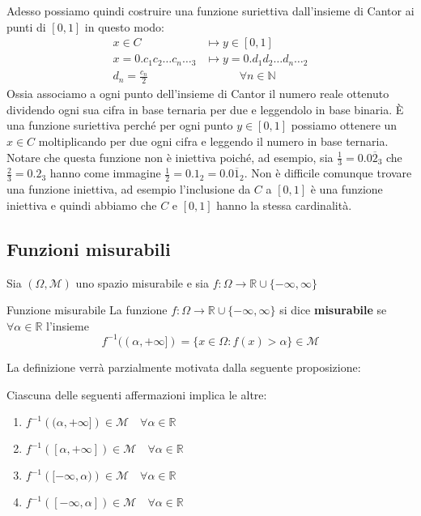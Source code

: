 \begin{example}
    Adesso possiamo quindi costruire una funzione suriettiva
    dall'insieme di Cantor ai punti di \([0, 1]\) in questo modo:
    \begin{align*}
        x \in C &\longmapsto y \in [0, 1] \\
        x = 0.c_{1}c_{2}\dots c_{n}\dots_3 &\longmapsto y =
        0.d_{1}d_{2}\dots d_{n}\dots_2 \\
        d_{n} = \frac{c_{n}}{2} \,&\quad\quad\quad \forall n \in \mathbb{N}
    \end{align*}
    Ossia associamo a ogni punto dell'insieme di Cantor il numero reale ottenuto
    dividendo ogni sua cifra in base ternaria per due e leggendolo in base
    binaria. È una funzione suriettiva perché per ogni punto \(y \in [0, 1]\) possiamo
    ottenere un \(x \in C\) moltiplicando per due ogni cifra e leggendo il
    numero in base ternaria. Notare che questa funzione non è iniettiva poiché,
    ad esempio, sia \(\frac{1}{3} = 0.0\overline{2}_3\) che \(\frac{2}{3} =
    0.2_3\) hanno come immagine \(\frac{1}{2} = 0.1_2 = 0.0\overline{1}_2\). Non
    è difficile comunque trovare una funzione iniettiva, ad esempio
    l'inclusione da \(C\) a \([0, 1]\) è una funzione iniettiva e quindi abbiamo
    che \(C\) e \([0, 1]\) hanno la stessa cardinalità.
\end{example}
\subsection{Funzioni misurabili}
Sia \((\Omega, \mathcal{M})\) uno spazio misurabile e sia \(f: \Omega \to
\mathbb{R} \cup \{-\infty, \infty\}\) 
\begin{definition}{Funzione misurabile}
    La funzione \(f : \Omega \to \mathbb{R} \cup \{-\infty, \infty \}\) si dice \textbf{misurabile} se \(\forall \alpha \in \mathbb{R}\) l'insieme
    \[
        f^{-1}((\alpha, +\infty]) = \{x \in \Omega : f(x) > \alpha\} \in \mathcal{M}
    \]
\end{definition}
La definizione verrà parzialmente motivata dalla seguente proposizione:
\begin{proposition}
    Ciascuna delle seguenti affermazioni implica le altre:
\begin{enumerate}[label = \roman*)]
    \item \(f ^{-1}\left((\alpha, +\infty]\right) \in \mathcal{M} \quad \forall \alpha \in \mathbb{R}\)
    \item \(f ^{-1}\left([\alpha, +\infty]\right) \in \mathcal{M} \quad \forall \alpha \in
        \mathbb{R}\)
    \item \(f ^{-1}\left([-\infty, \alpha)\right) \in \mathcal{M} \quad \forall \alpha \in
        \mathbb{R}\)
    \item \(f ^{-1}\left([-\infty, \alpha]\right) \in \mathcal{M} \quad \forall \alpha \in 
        \mathbb{R}\) 
\end{enumerate}
\end{proposition}

